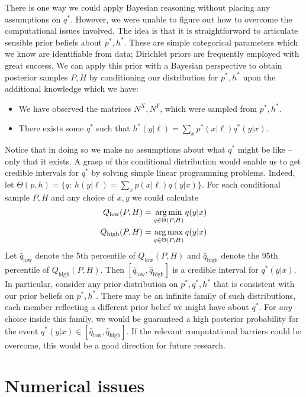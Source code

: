 \begin{itemize}
There is one way we could apply Bayesian reasoning without placing any assumptions on $q^*$.  However, we were unable to figure out how to overcome the computational issues involved.  The idea is that it is straightforward to articulate sensible prior beliefs about $p^*,h^*$.  These are simple categorical parameters which we know are identifiable from data; Dirichlet priors are frequently employed with great success.  We can apply this prior with a Bayesian perspective to obtain posterior samples $P,H$ by conditioning our distribution for $p^*,h^*$ upon the additional knowledge which we have:
%
\begin{itemize}
    \item We have observed the matrices $N^X,N^Y$, which were sampled from $p^*,h^*$.
    \item There exists some $q^*$ such that $h^*(y|\ell)=\sum_x p^*(x|\ell)q^*(y|x)$.
\end{itemize}
%
Notice that in doing so we make no assumptions about what $q^*$ might be like -- only that it exists.  A grasp of this conditional distribution would enable us to get credible intervals for $q^*$ by solving simple linear programming problems.  Indeed, let $\Theta(p,h) = \{q:\ h(y|\ell)=\sum_x p(x|\ell)q(y|x) \}$.  For each conditional sample $P,H$ and any choice of $x,y$ we could calculate
%
\begin{align*}
Q_\mathrm{low}(P,H) &= \operatorname*{arg\,min}_{q\in\Theta(P,H)} q(y|x)\\
Q_\mathrm{high}(P,H) &= \operatorname*{arg\,max}_{q\in\Theta(P,H)} q(y|x)
\end{align*}
%
Let $\hat q_\mathrm{low}$ denote the 5th percentile of $Q_\mathrm{low}(P,H)$ and $\hat q_\mathrm{high}$ denote the 95th percentile of $Q_\mathrm{high}(P,H)$.  Then $[\hat q_\mathrm{low},\hat q_\mathrm{high}]$ is a credible interval for $q^*(y|x)$.  In particular, consider any prior distribution on $p^*,q^*,h^*$ that is consistent with our prior beliefs on $p^*,h^*$.  There may be an infinite family of such distributions, each member reflecting a different prior belief we might have about $q^*$.  For \emph{any} choice inside this family, we would be guaranteed a high posterior probability for the event $q^*(y|x) \in [\hat q_\mathrm{low},\hat q_\mathrm{high}]$.  If the relevant computational barriers could be overcome, this would be a good direction for future research.

\section{Numerical issues}


\end{itemize}
